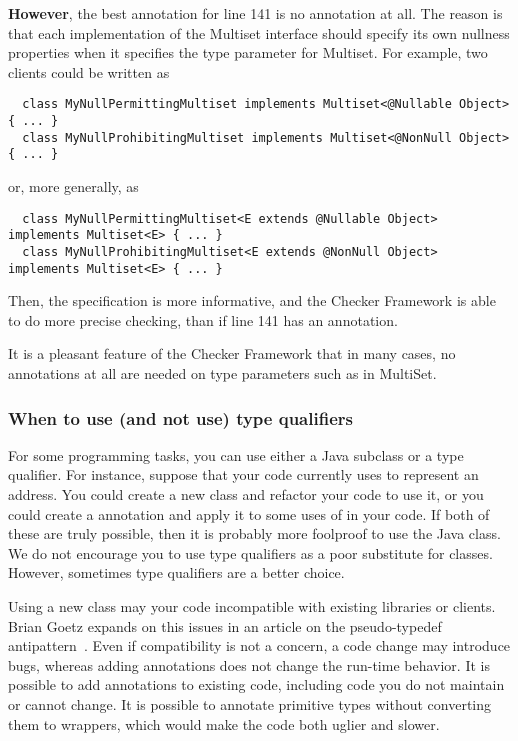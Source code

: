 \textbf{However}, the best annotation for line 141 is no annotation at all.
The reason is that each implementation of the Multiset interface should
specify its own nullness properties when it specifies the type parameter
for Multiset.  For example, two clients could be written as

\begin{Verbatim}
  class MyNullPermittingMultiset implements Multiset<@Nullable Object> { ... }
  class MyNullProhibitingMultiset implements Multiset<@NonNull Object> { ... }
\end{Verbatim}

\noindent
or, more generally, as

\begin{Verbatim}
  class MyNullPermittingMultiset<E extends @Nullable Object> implements Multiset<E> { ... }
  class MyNullProhibitingMultiset<E extends @NonNull Object> implements Multiset<E> { ... }
\end{Verbatim}

Then, the specification is more informative, and the Checker Framework is
able to do more precise checking, than if line 141 has an annotation.

It is a pleasant feature of the Checker Framework that in many cases, no
annotations at all are needed on type parameters such as  in MultiSet.


\subsubsection{When to use (and not use) type qualifiers\label{when-to-use-type-qualifiers}}

For some programming tasks, you can use either a Java subclass or a type
qualifier.  For instance, suppose that your code currently uses
 to represent an address.  You could create a new 
class and refactor your code to use it, or you could create a
 annotation and apply it to some uses of  in
your code.  If both of these are truly possible, then it is probably more
foolproof to use the Java class.  We do not encourage you to use type
qualifiers as a poor substitute for classes.  However, sometimes type
qualifiers are a better choice.

Using a new class may your code incompatible with existing libraries or
clients.  Brian Goetz expands on this issues in an article on the
pseudo-typedef antipattern~\cite{Goetz2006:typedef}.  Even if compatibility
is not a concern, a code change may introduce bugs, whereas adding
annotations does not change the run-time behavior.  It is possible to add
annotations to existing code, including code you do not maintain or cannot
change.  It is possible to annotate primitive types without converting them
to wrappers, which would make the code both uglier and slower.

